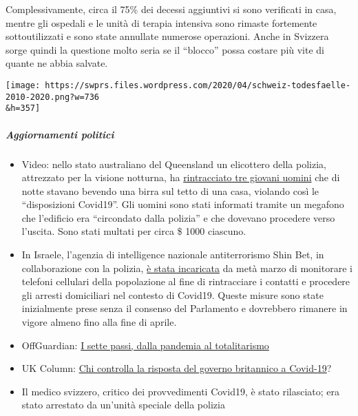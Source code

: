 Complessivamente, circa il 75\% dei decessi aggiuntivi si sono
verificati in casa, mentre gli ospedali e le unità di terapia intensiva
sono rimaste fortemente sottoutilizzati e sono state annullate numerose
operazioni. Anche in Svizzera sorge quindi la questione molto seria se
il ``blocco'' possa costare più vite di quante ne abbia salvate.

\texttt{[image: https://swprs.files.wordpress.com/2020/04/schweiz-todesfaelle-2010-2020.png?w=736\\\&h=357]}

\hypertarget{aggiornamenti-politici}{%
\subparagraph{\texorpdfstring{\textbf{Aggiornamenti
politici}}{Aggiornamenti politici}}\label{aggiornamenti-politici}}

\begin{itemize}
\tightlist
\item
  Video: nello stato australiano del Queensland un elicottero della
  polizia, attrezzato per la visione notturna, ha
  \href{https://twitter.com/Independent/status/1252911273597120513}{rintracciato
  tre giovani uomini} che di notte stavano bevendo una birra sul tetto
  di una casa, violando così le ``disposizioni Covid19''. Gli uomini
  sono stati informati tramite un megafono che l'edificio era
  ``circondato dalla polizia'' e che dovevano procedere verso l'uscita.
  Sono stati multati per circa \$ 1000 ciascuno.
\item
  In Israele, l'agenzia di intelligence nazionale antiterrorismo Shin
  Bet, in collaborazione con la polizia,
  \href{https://www.jewishpress.com/news/the-courts/state-to-high-court-even-more-shin-bet-involvement-in-fighting-the-coronavirus/2020/04/14/}{è
  stata incaricata} da metà marzo di monitorare i telefoni cellulari
  della popolazione al fine di rintracciare i contatti e procedere gli
  arresti domiciliari nel contesto di Covid19. Queste misure sono state
  inizialmente prese senza il consenso del Parlamento e dovrebbero
  rimanere in vigore almeno fino alla fine di aprile.
\item
  OffGuardian:
  \href{https://off-guardian.org/2020/04/23/the-seven-step-path-from-pandemic-to-totalitarianism/}{I
  sette passi, dalla pandemia al totalitarismo}
\item
  UK Column:
  \href{https://www.ukcolumn.org/article/who-controls-british-government-response-covid19-part-one}{Chi
  controlla la risposta del governo britannico a Covid-19}?
\item
  Il medico svizzero, critico dei provvedimenti Covid19, è stato
  rilasciato; era stato arrestato da un'unità speciale della polizia

\end{itemize}
